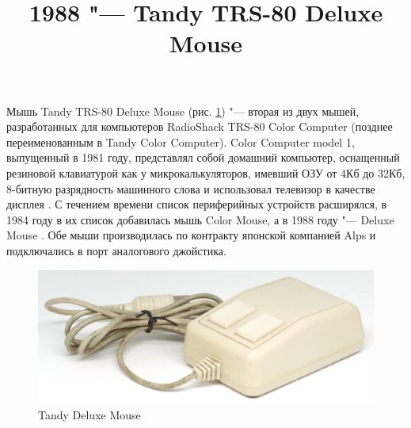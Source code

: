 \documentclass[11pt, a4paper]{article}
\begin{document}
\title{1988 "--- Tandy TRS-80 Deluxe Mouse}
\date{}
\maketitle
{}
Мышь Tandy TRS-80 Deluxe Mouse (рис. \ref{fig:TandyDeluxeMousePic}) "--- вторая из двух мышей, разработанных для компьютеров RadioShack TRS-80 Color Computer (позднее переименованным в Tandy Color Computer). Color Computer model 1, выпущенный в 1981 году, представлял собой домашний компьютер, оснащенный резиновой клавиатурой как у микрокалькуляторов, имевший ОЗУ от 4Кб до 32Кб, 8-битную разрядность машинного слова и использовал телевизор в качестве дисплея \cite{wiki}. С течением времени список периферийных устройств расширялся, в 1984 году в их список добавилась мышь Color Mouse, а в 1988 году "--- Deluxe Mouse \cite{adv}. Обе мыши производилась по контракту японской компанией Alps и подключались в порт аналогового джойстика.

\begin{figure}[h]
    \centering
    \includegraphics[scale=0.7]{1988_tandy_trs80_deluxe_mouse/pic_30.jpg}
    \caption{Tandy Deluxe Mouse}
    \label{fig:TandyDeluxeMousePic}
\end{figure}
\end{document}
